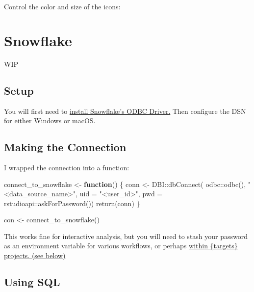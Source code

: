 \documentclass[
  letterpaper,
  DIV=11,
  numbers=noendperiod]{scrreprt}
\newenvironment{Shaded}{\begin{snugshade}}{\end{snugshade}}
\newcommand{\AttributeTok}[1]{\textcolor[rgb]{0.40,0.45,0.13}{#1}}
\newcommand{\ControlFlowTok}[1]{\textcolor[rgb]{0.00,0.23,0.31}{\textbf{#1}}}
\newcommand{\FunctionTok}[1]{\textcolor[rgb]{0.28,0.35,0.67}{#1}}
\newcommand{\NormalTok}[1]{\textcolor[rgb]{0.00,0.23,0.31}{#1}}
\newcommand{\OtherTok}[1]{\textcolor[rgb]{0.00,0.23,0.31}{#1}}
\newcommand{\SpecialCharTok}[1]{\textcolor[rgb]{0.37,0.37,0.37}{#1}}
\newcommand{\StringTok}[1]{\textcolor[rgb]{0.13,0.47,0.30}{#1}}
\begin{document}
Control the color and size of the icons:


\chapter{Snowflake}\label{snowflake}

WIP

\section{Setup}\label{setup}

You will first need to
\href{https://docs.snowflake.com/en/developer-guide/odbc/odbc}{install
Snowflake's ODBC Driver.} Then configure the DSN for either Windows or
macOS.

\section{Making the Connection}\label{making-the-connection}

I wrapped the connection into a function:

\begin{Shaded}
\begin{Highlighting}[]
\NormalTok{connect\_to\_snowflake }\OtherTok{\textless{}{-}} \ControlFlowTok{function}\NormalTok{() \{}
\NormalTok{  conn }\OtherTok{\textless{}{-}}\NormalTok{ DBI}\SpecialCharTok{::}\FunctionTok{dbConnect}\NormalTok{(}
\NormalTok{    odbc}\SpecialCharTok{::}\FunctionTok{odbc}\NormalTok{(), }
    \StringTok{"\textless{}data\_source\_name\textgreater{}"}\NormalTok{, }
    \AttributeTok{uid =} \StringTok{"\textless{}user\_id\textgreater{}"}\NormalTok{, }
    \AttributeTok{pwd =}\NormalTok{ rstudioapi}\SpecialCharTok{::}\FunctionTok{askForPassword}\NormalTok{())}
  \FunctionTok{return}\NormalTok{(conn)}
\NormalTok{\}}

\NormalTok{con }\OtherTok{\textless{}{-}} \FunctionTok{connect\_to\_snowflake}\NormalTok{()}
\end{Highlighting}
\end{Shaded}

This works fine for interactive analysis, but you will need to stash
your password as an environment variable for various workflows, or
perhaps \href{https://github.com/ropensci/targets}{within \{targets\}
projects. (see below)}

\section{Using SQL}\label{using-sql}
\end{document}
